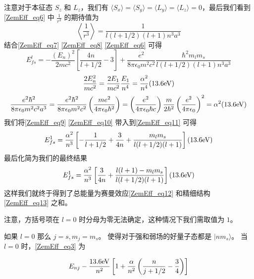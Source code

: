 注意对于本征态 $S_z$ 和 $L_z$，我们有 $\langle S_x\rangle=\langle S_y\rangle=\langle L_y\rangle=\langle L_z\rangle=0$，最后我们看到\autoref{ZemEff_eq6} 中 $\frac{1}{r^3}$ 的期待值为
\begin{equation}\label{ZemEff_eq11}
\left\langle\frac{1}{r^3}\right\rangle=\frac{1}{l(l+1/2)(l+1)n^3a^3}
\end{equation}
结合\autoref{ZemEff_eq7} \autoref{ZemEff_eq8} \autoref{ZemEff_eq6} 可得
\begin{equation}\label{ZemEff_eq9}
E_{fs}^l= -\frac{(E_n)^2}{2mc^2}\left[\frac{4n}{l+1/2}-3\right]+\frac{e^2}{8\pi\epsilon_0m^2c^2}\frac{\hbar^2
m_lm_s}{l(l+1/2)(l+1)n^3a^3}
\end{equation}
\begin{equation}\label{ZemEff_eq10}
\frac{2E_n^2}{mc^2}=\frac{2E_1}{mc^2}\frac{E_1}{n^4}=\frac{\alpha^2}{n^4}(13.6\rm{eV})
\end{equation}
\begin{equation}
\frac{e^2\hbar^2}{8\pi\epsilon_0m^2c^2a^3}=\frac{e^2\hbar^2}{8\pi\epsilon_0m^2c^2}\left(\frac{me^2}{4\pi\epsilon_0\hbar^2}\right)=\left(\frac{e^2}{4\pi\epsilon_0\hbar c}\right)\frac{m}{2\hbar^2}\left(\frac{e^2}{4\pi\epsilon_0}\right)^2=\alpha^2(13.6\rm{eV})
\end{equation}
我们将\autoref{ZemEff_eq9} \autoref{ZemEff_eq10} 带入到\autoref{ZemEff_eq11} 可得
\begin{equation}\label{ZemEff_eq13}
E_{fs}^1=\frac{\alpha^2}{n^3}\left[-\frac{1}{l+1/2}+\frac{3}{4n}+\frac{m_lm_s}{l(l+1/2)(l+1)}\right](13.6 \rm eV) 
\end{equation}
最后化简为我们的最终结果
\begin{equation}
E_{fs}^1=\frac{\alpha^2}{n^3}\left[\frac{3}{4n}+\frac{l(l+1)-m_lm_s}{l(l+1/2)(l+1)}\right](13.6 \rm eV)
\end{equation}
这样我们就终于得到了总能量为赛曼效应\autoref{ZemEff_eq12} 和精细结构 \autoref{ZemEff_eq13} 之和。

注意，方括号项在 $l=0$ 时分母为零无法确定，这种情况下我们需取值为 $1$。
\begin{example}{}
如果 $l=0$ 那么 $j=s,m_j=m_s$。 使得对于强和弱场的好量子态都是 $|nm_s\rangle$。 当 $l=0$ 时，\autoref{ZemEff_eq3} 为

\begin{equation}
E_{nj}-\frac{13.6\rm{eV}}{n^2}\left[1+\frac{\alpha}{n^2}\left(\frac{n}{j+1/2}-\frac{3}{4}\right)\right]
\end{equation}

\end{example}

